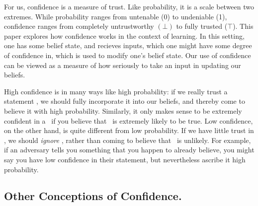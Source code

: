 \documentclass{article}
\begin{document}




For us, confidence is a measure of trust. 
Like probability, it is a scale between two extremes. 
While probability ranges from untenable (0) to undeniable (1),
confidence ranges from completely untrustworthy $(\bot)$ to fully trusted ($\top$). 
%
This paper explores how confidence works in the context of learning.
In this setting, one has some belief state, and recieves inputs, which one might have some degree of confidence in, which is used to modify one's belief state. 
Our use of confidence can be viewed as a measure of how seriously to take an input in updating our beliefs.

High confidence is in many ways like high probability: if we really trust a statement \stmt, we should fully incorporate it into our beliefs, and thereby come to believe it with high probability. 
Similarly, it only makes sense to be extremely confident in a \stmt\ if you believe that \stmt\ is extremely likely to be true. 
Low confidence, on the other hand, is quite different from low probability. 
If we have little trust in \stmt, we should \emph{ignore} \stmt, rather than coming to believe that \stmt\ is unlikely.
For example, if an adversary tells you something that you happen to already believe,
you might say you have low confidence in their statement, but nevertheless ascribe it high probability. 



\subsection{Other Conceptions of Confidence.}
\end{document}
